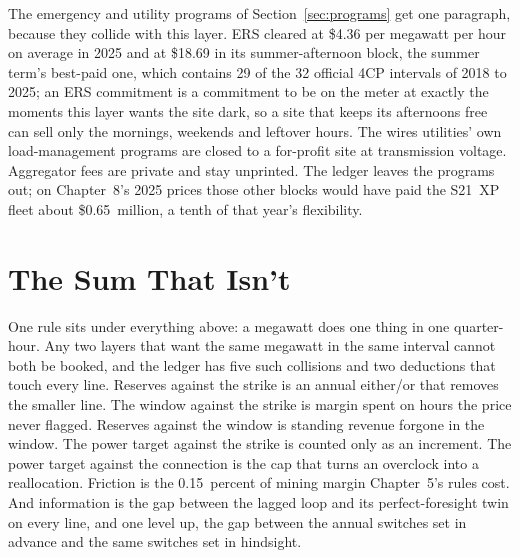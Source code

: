 The emergency and utility programs of Section~\ref{sec:programs} get one paragraph, because they collide with this layer. ERS cleared at \$4.36 per megawatt per hour on average in 2025 and at \$18.69 in its summer-afternoon block, the summer term's best-paid one, which contains 29 of the 32 official 4CP intervals of 2018 to 2025; an ERS commitment is a commitment to be on the meter at exactly the moments this layer wants the site dark, so a site that keeps its afternoons free can sell only the mornings, weekends and leftover hours. The wires utilities' own load-management programs are closed to a for-profit site at transmission voltage. Aggregator fees are private and stay unprinted. The ledger leaves the programs out; on Chapter~8's 2025 prices those other blocks would have paid the S21~XP fleet about \$0.65~million, a tenth of that year's flexibility. %

\section{The Sum That Isn't}
\label{sec:stack-sum}

One rule sits under everything above: a megawatt does one thing in one quarter-hour. Any two layers that want the same megawatt in the same interval cannot both be booked, and the ledger has five such collisions and two deductions that touch every line. Reserves against the strike is an annual either/or that removes the smaller line. The window against the strike is margin spent on hours the price never flagged. Reserves against the window is standing revenue forgone in the window. The power target against the strike is counted only as an increment. The power target against the connection is the cap that turns an overclock into a reallocation. Friction is the 0.15~percent of mining margin Chapter~5's rules cost. And information is the gap between the lagged loop and its perfect-foresight twin on every line, and one level up, the gap between the annual switches set in advance and the same switches set in hindsight.


